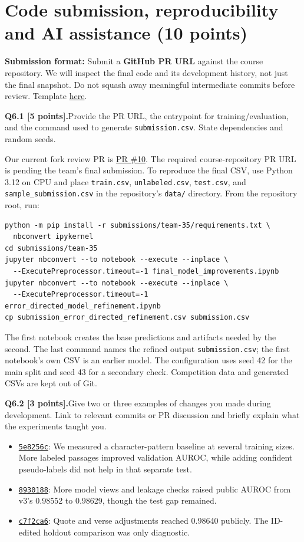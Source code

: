 \documentclass[11pt,letterpaper]{article}
\newcommand{\question}[2]{\needspace{4\baselineskip}\par\addvspace{0.45em}\noindent\textbf{#1}\quad #2\par\nobreak\vspace{0.1em}}
\begin{document}
\section{Code submission, reproducibility and AI assistance (10 points)}
\textbf{Submission format:} Submit a \textbf{GitHub PR URL} against the course repository. We will inspect the final code and its development history, not just the final snapshot. Do not squash away meaningful intermediate commits before review. Template \href{https://github.com/sekhari/human-or-ai-submissions}{here}.

\question{Q6.1 [5 points].}{Provide the PR URL, the entrypoint for training/evaluation, and the command used to generate \texttt{submission.csv}. State dependencies and random seeds.}
Our current fork review PR is \href{https://github.com/jaminatore/human-or-ai-submissions/pull/10}{PR \#10}. The required course-repository PR URL is pending the team's final submission. To reproduce the final CSV, use Python 3.12 on CPU and place \texttt{train.csv}, \texttt{unlabeled.csv}, \texttt{test.csv}, and \texttt{sample\_submission.csv} in the repository's \texttt{data/} directory. From the repository root, run:
\begin{verbatim}
python -m pip install -r submissions/team-35/requirements.txt \
  nbconvert ipykernel
cd submissions/team-35
jupyter nbconvert --to notebook --execute --inplace \
  --ExecutePreprocessor.timeout=-1 final_model_improvements.ipynb
jupyter nbconvert --to notebook --execute --inplace \
  --ExecutePreprocessor.timeout=-1 error_directed_model_refinement.ipynb
cp submission_error_directed_refinement.csv submission.csv
\end{verbatim}
The first notebook creates the base predictions and artifacts needed by the second. The last command names the refined output \texttt{submission.csv}; the first notebook's own CSV is an earlier model. The configuration uses seed 42 for the main split and seed 43 for a secondary check. Competition data and generated CSVs are kept out of Git.
\question{Q6.2 [3 points].}{Give two or three examples of changes you made during development. Link to relevant commits or PR discussion and briefly explain what the experiments taught you.}
\begin{itemize}
\item \href{https://github.com/jaminatore/human-or-ai-submissions/commit/5e8256c}{\texttt{5e8256c}}: We measured a character-pattern baseline at several training sizes. More labeled passages improved validation AUROC, while adding confident pseudo-labels did not help in that separate test.
\item \href{https://github.com/jaminatore/human-or-ai-submissions/commit/8930188}{\texttt{8930188}}: More model views and leakage checks raised public AUROC from v3's 0.98552 to 0.98629, though the test gap remained.
\item \href{https://github.com/jaminatore/human-or-ai-submissions/commit/c7f2ca6}{\texttt{c7f2ca6}}: Quote and verse adjustments reached 0.98640 publicly. The ID-edited holdout comparison was only diagnostic.
\end{itemize}
\end{document}
